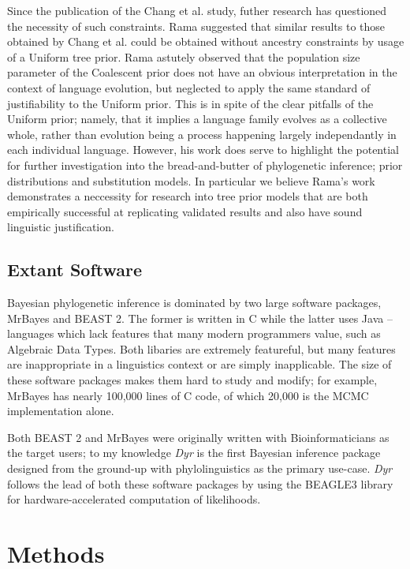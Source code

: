 \documentclass[10pt,journal,compsoc]{IEEEtran}
\begin{document}
Since the publication of the Chang et al. study, futher research has questioned the necessity of such constraints. Rama suggested that similar results to those obtained by Chang et al. could be obtained without ancestry constraints by usage of a Uniform tree prior.\cite{rama2018three} Rama astutely observed that the population size parameter of the Coalescent prior does not have an obvious interpretation in the context of language evolution, but neglected to apply the same standard of justifiability to the Uniform prior. This is in spite of the clear pitfalls of the Uniform prior; namely, that it implies a language family evolves as a collective whole, rather than evolution being a process happening largely independantly in each individual language. However, his work does serve to highlight the potential for further investigation into the bread-and-butter of phylogenetic inference; prior distributions and substitution models. In particular we believe Rama's work demonstrates a neccessity for research into tree prior models that are both empirically successful at replicating validated results and also have sound linguistic justification. 

\subsection{Extant Software}

Bayesian phylogenetic inference is dominated by two large software packages, MrBayes\cite{ronquist2012mrbayes} and BEAST 2\cite{bouckaert2014beast}. The former is written in C while the latter uses Java -- languages which lack features that many modern programmers value, such as Algebraic Data Types. Both libaries are extremely featureful, but many features are inappropriate in a linguistics context or are simply inapplicable. The size of these software packages makes them hard to study and modify; for example, MrBayes has nearly 100,000 lines of C code, of which 20,000 is the MCMC implementation alone.

Both BEAST 2 and MrBayes were originally written with Bioinformaticians as the target users; to my knowledge \textit{Dyr} is the first Bayesian inference package designed from the ground-up with phylolinguistics as the primary use-case. \textit{Dyr} follows the lead of both these software packages by using the BEAGLE3 library for hardware-accelerated computation of likelihoods.\cite{ayres2019beagle}

\section{Methods}
\end{document}
